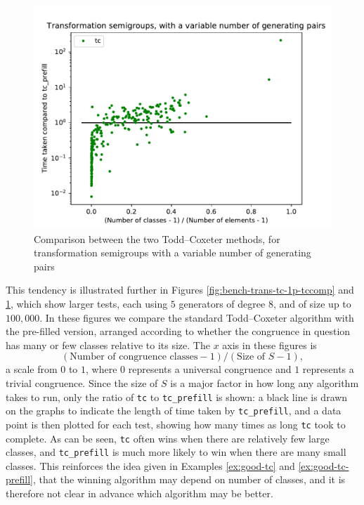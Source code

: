\begin{figure}[p]
  \centering
  \includegraphics[width=\textwidth]{pics/ch-pairs/bench-trans-tc-vp-tccomp}
  \caption[Benchmark: Todd--Coxeter, concrete, $n$ pairs]
  {Comparison between the two Todd--Coxeter methods, for transformation
    semigroups with a variable number of generating pairs}
  \label{fig:bench-trans-tc-vp-tccomp}
\end{figure}

This tendency is illustrated further in Figures
\ref{fig:bench-trans-tc-1p-tccomp} and
\ref{fig:bench-trans-tc-vp-tccomp}, which show larger tests, each using $5$
generators of degree $8$, and of size up to $100,000$.  In these figures we
compare the standard Todd--Coxeter algorithm with the pre-filled version, arranged
according to whether the congruence in question has many or few classes relative
to its size.  The $x$ axis in these figures is
$$(\text{Number of congruence classes} - 1) / (\text{Size of~} S - 1),$$
a scale from $0$ to $1$, where $0$ represents a universal congruence and $1$
represents a trivial congruence.  Since the size of $S$ is a major factor in how
long any algorithm takes to run, only the ratio of \texttt{tc} to
\texttt{tc\_prefill} is shown: a black line is drawn on the graphs to indicate
the length of time taken by \texttt{tc\_prefill}, and a data point is then
plotted for each test, showing how many times as long \texttt{tc} took to
complete.  As can be seen, \texttt{tc} often wins when there are relatively few
large classes, and \texttt{tc\_prefill} is much more likely to win when there are
many small classes.  This reinforces the idea given in Examples \ref{ex:good-tc}
and \ref{ex:good-tc-prefill}, that the winning algorithm may depend on number of
classes, and it is therefore not clear in advance which algorithm may be better.

